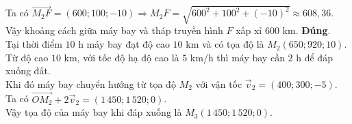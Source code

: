 \begin{ex}
{\begin{itemchoice}
			Ta có $\overrightarrow{M_2F}=(600;100;-10)\Rightarrow M_2F=\sqrt{600^2+100^2+(-10)^2} \approx 608{,}36$.\\ 
			Vậy khoảng cách giữa máy bay và tháp truyền hình $F$ xấp xỉ $600$ km.
			\itemch \textbf{Đúng}.\\
			Tại thời điểm $10$ h máy bay đạt độ cao $10$ km và có tọa độ là $M_2(650;920;10)$.\\
			Từ độ cao $10$ km, với tốc độ hạ độ cao là $5$ km/h thì máy bay cần $2$ h để đáp xuống đất.\\
			Khi đó máy bay chuyển hướng từ tọa độ $M_2$ với vận tốc $\overrightarrow{v}_2=(400;300;-5)$.\\
			Ta có $\overrightarrow{OM_2}+2\overrightarrow{v}_2=(1\,450;1\,520;0)$.\\ 
			Vậy tọa độ của máy bay khi đáp xuống là $M_3(1\,450;1\,520;0)$.
	\end{itemchoice}
}
\end{ex}

